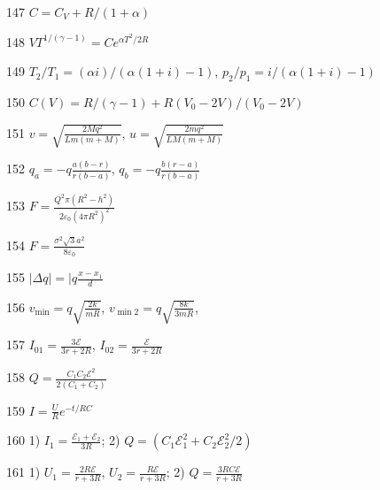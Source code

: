 \begin{Answer}{147}
$C = C_V + R/(1+\alpha)$
\end{Answer}
\begin{Answer}{148}
$ V T^{1/(\gamma - 1)} = C e^{\alpha T^2 / 2R}$
\end{Answer}
\begin{Answer}{149}
$T_2/T_1 = (\alpha i)/(\alpha (1+i) - 1)$, $p_2/p_1 = i/(\alpha (1+i) - 1)$
\end{Answer}
\begin{Answer}{150}
$C(V) = R/(\gamma-1)+R(V_0-2V)/(V_0-2V)$
\end{Answer}
\begin{Answer}{151}
$v = \sqrt{\frac{2Mq^2}{Lm(m+M)}}$, $u = \sqrt{\frac{2mq^2}{LM(m+M)}}$
\end{Answer}
\begin{Answer}{152}
$q_a = -q\frac{a(b-r)}{r(b-a)}$, $q_b = -q\frac{b(r-a)}{r(b-a)}$
\end{Answer}
\begin{Answer}{153}
$F = \frac{Q^2 \pi (R^2-h^2)}{2 \varepsilon_0 {(4 \pi R^2)}^2}$
\end{Answer}
\begin{Answer}{154}
$F = \frac{\sigma^2 \sqrt{3}a^2}{8\varepsilon_0}$
\end{Answer}
\begin{Answer}{155}
$\mid\Delta q \mid = \mid q \frac{x-x_1}{d}$
\end{Answer}
\begin{Answer}{156}
$v_{\min} = q\sqrt{\frac{2k}{mR}}$, $v_{\min 2} = q\sqrt{\frac{8k}{3mR}}$,
\end{Answer}
\begin{Answer}{157}
$I_{01} = \frac{3 \mathcal{E}}{3r+2R}$, $I_{02} = \frac{\mathcal{E}}{3r+2R}$
\end{Answer}
\begin{Answer}{158}
$Q=\frac{C_1C_2 \mathcal{E}^2}{2(C_1+C_2)}$
\end{Answer}
\begin{Answer}{159}
$I = \frac{U}{R} e^{-t/RC}$
\end{Answer}
\begin{Answer}{160}
1) $I_1=\frac{\mathcal{E}_1 + \mathcal{E}_2}{3R}$; 2) $Q=(C_1 \mathcal{E}_1^2 + C_2 \mathcal{E}_2^2/2)$
\end{Answer}
\begin{Answer}{161}
1) $U_1 = \frac{2R \mathcal{E}}{r+3R}$, $U_2 = \frac{R \mathcal{E}}{r+3R}$; 2) $Q=\frac{3RC\mathcal{E}}{r+3R}$
\end{Answer}
